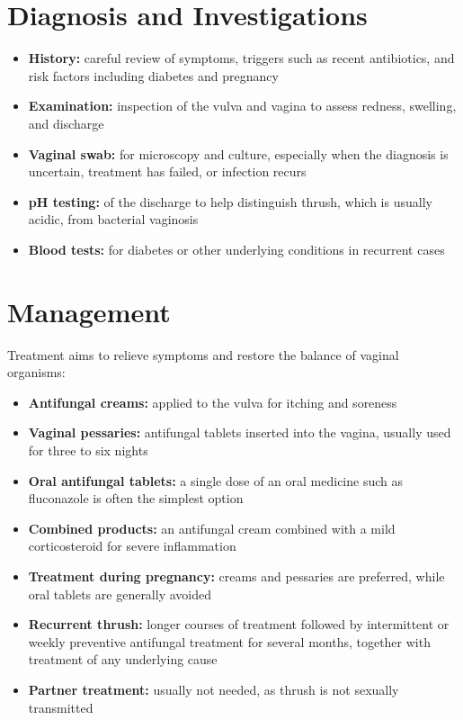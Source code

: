 \section*{Diagnosis and Investigations}
\begin{itemize}
    \item \textbf{History:} careful review of symptoms, triggers such as recent antibiotics, and risk factors including diabetes and pregnancy
    \item \textbf{Examination:} inspection of the vulva and vagina to assess redness, swelling, and discharge
    \item \textbf{Vaginal swab:} for microscopy and culture, especially when the diagnosis is uncertain, treatment has failed, or infection recurs
    \item \textbf{pH testing:} of the discharge to help distinguish thrush, which is usually acidic, from bacterial vaginosis
    \item \textbf{Blood tests:} for diabetes or other underlying conditions in recurrent cases
\end{itemize}

\section*{Management}
Treatment aims to relieve symptoms and restore the balance of vaginal organisms:
\begin{itemize}
    \item \textbf{Antifungal creams:} applied to the vulva for itching and soreness
    \item \textbf{Vaginal pessaries:} antifungal tablets inserted into the vagina, usually used for three to six nights
    \item \textbf{Oral antifungal tablets:} a single dose of an oral medicine such as fluconazole is often the simplest option
    \item \textbf{Combined products:} an antifungal cream combined with a mild corticosteroid for severe inflammation
    \item \textbf{Treatment during pregnancy:} creams and pessaries are preferred, while oral tablets are generally avoided
    \item \textbf{Recurrent thrush:} longer courses of treatment followed by intermittent or weekly preventive antifungal treatment for several months, together with treatment of any underlying cause
    \item \textbf{Partner treatment:} usually not needed, as thrush is not sexually transmitted
\end{itemize}


